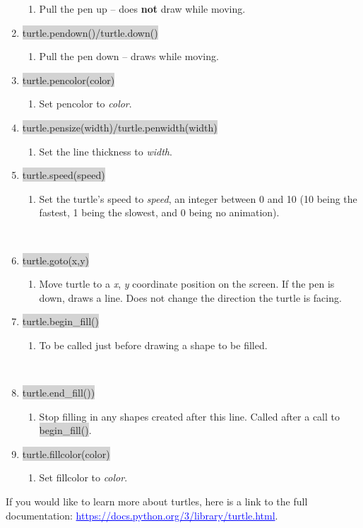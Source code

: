 \documentclass[11pt, letterpaper, onecolumn, oneside, final]{article}
\begin{document}
\begin{enumerate}
\begin{enumerate}
\item Pull the pen up – does \textbf{not} draw while moving.
\end{enumerate}
\item\colorbox{lightgray}{\consolas turtle.pendown()/turtle.down()}
\begin{enumerate}
\item Pull the pen down – draws while moving.
\end{enumerate}
\item\colorbox{lightgray}{\consolas turtle.pencolor(color)}
\begin{enumerate}
\item Set pencolor to \emph{color}.
\end{enumerate}
\item\colorbox{lightgray}{\consolas turtle.pensize(width)/turtle.penwidth(width)}
\begin{enumerate}
\item Set the line thickness to \emph{width}.
\end{enumerate}
\item\colorbox{lightgray}{\consolas turtle.speed(speed)}
\begin{enumerate}
\item Set the turtle’s speed to \emph{speed}, an integer between 0 and 10 (10 being the fastest, 1 being the slowest, and 0 being no animation).
\end{enumerate}\\
\newpage
\item\colorbox{lightgray}{\consolas turtle.goto(x,y)}
\begin{enumerate}
\item Move turtle to a \emph{x}, \emph{y} coordinate position on the screen. If the pen is down, draws a line. Does not change the direction the turtle is facing.
\end{enumerate}
\item\colorbox{lightgray}{\consolas turtle.begin\_fill()}
\begin{enumerate}
\item To be called just before drawing a shape to be filled.
\end{enumerate}
\\
\item\colorbox{lightgray}{\consolas turtle.end\_fill())}
\begin{enumerate}
\item Stop filling in any shapes created after this line. Called after a call to \colorbox{lightgray}{\consolas begin\_fill()}.
\end{enumerate}
\item\colorbox{lightgray}{\consolas turtle.fillcolor(color)}
\begin{enumerate}
\item Set fillcolor to \emph{color}.
\end{enumerate}
\end{enumerate}
If you would like to learn more about turtles, here is a link to the full documentation:
\newline\textcolor{blue}{\underline{https://docs.python.org/3/library/turtle.html}}.
\end{document}
